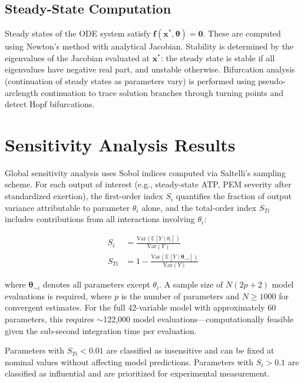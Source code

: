 \subsection{Steady-State Computation}

Steady states of the ODE system satisfy $\mathbf{f}(\mathbf{x}^*, \boldsymbol{\theta}) = \mathbf{0}$. These are computed using Newton's method with analytical Jacobian. Stability is determined by the eigenvalues of the Jacobian evaluated at $\mathbf{x}^*$: the steady state is stable if all eigenvalues have negative real part, and unstable otherwise. Bifurcation analysis (continuation of steady states as parameters vary) is performed using pseudo-arclength continuation to trace solution branches through turning points and detect Hopf bifurcations.

\section{Sensitivity Analysis Results}
\label{sec:sensitivity-analysis}

Global sensitivity analysis uses Sobol indices computed via Saltelli's sampling scheme. For each output of interest (e.g., steady-state ATP, PEM severity after standardized exertion), the first-order index $S_i$ quantifies the fraction of output variance attributable to parameter $\theta_i$ alone, and the total-order index $S_{Ti}$ includes contributions from all interactions involving $\theta_i$:

\begin{align}
S_i &= \frac{\text{Var}(\mathbb{E}[Y \mid \theta_i])}{\text{Var}(Y)} \label{eq:sobol-first} \\
S_{Ti} &= 1 - \frac{\text{Var}(\mathbb{E}[Y \mid \boldsymbol{\theta}_{\sim i}])}{\text{Var}(Y)} \label{eq:sobol-total}
\end{align}

where $\boldsymbol{\theta}_{\sim i}$ denotes all parameters except $\theta_i$. A sample size of $N(2p+2)$ model evaluations is required, where $p$ is the number of parameters and $N \geq 1000$ for convergent estimates. For the full 42-variable model with approximately 60 parameters, this requires $\sim$122{,}000 model evaluations---computationally feasible given the sub-second integration time per evaluation.

Parameters with $S_{Ti} < 0.01$ are classified as insensitive and can be fixed at nominal values without affecting model predictions. Parameters with $S_i > 0.1$ are classified as influential and are prioritized for experimental measurement.

